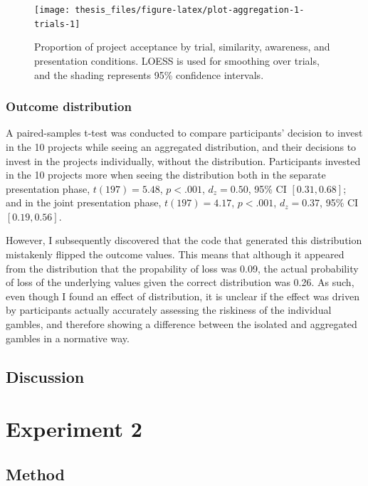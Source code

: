 \documentclass[a4paper, nobind, dvipsnames]{templates/ociamthesis}
\theoremstyle{definition}
\theoremstyle{definition}
\theoremstyle{definition}
\theoremstyle{definition}
\theoremstyle{remark}
\begin{document}
\begin{figure}
\texttt{[image: thesis\_files/figure-latex/plot-aggregation-1-trials-1]} \caption{Proportion of project acceptance by trial, similarity, awareness, and presentation conditions. LOESS is used for smoothing over trials, and the shading represents 95\% confidence intervals.}\label{fig:plot-aggregation-1-trials}
\end{figure}

\hypertarget{outcome-distribution-aggregation-1}{%
\subsubsection{Outcome distribution}\label{outcome-distribution-aggregation-1}}

A paired-samples t-test was conducted to compare participants' decision to
invest in the 10 projects while seeing an aggregated distribution, and their
decisions to invest in the projects individually, without the distribution.
Participants invested in the 10 projects more when seeing the distribution both
in the separate presentation phase,
\(t(197) = 5.48\), \(p < .001\), \(d_z = 0.50\), 95\% CI \([0.31, 0.68]\); and in the joint
presentation phase, \(t(197) = 4.17\), \(p < .001\), \(d_z = 0.37\), 95\% CI \([0.19, 0.56]\).

However, I subsequently discovered that the code that generated this
distribution mistakenly flipped the outcome values. This means that although it
appeared from the distribution that the propability of loss was
0.09, the actual probability of loss of the
underlying values given the correct distribution was
0.26. As such, even though I found an
effect of distribution, it is unclear if the effect was driven by participants
actually accurately assessing the riskiness of the individual gambles, and
therefore showing a difference between the isolated and aggregated gambles in a
normative way.

\hypertarget{discussion-aggregation-1-appendix}{%
\subsection{Discussion}\label{discussion-aggregation-1-appendix}}

\hypertarget{experiment-2-1}{%
\section{Experiment 2}\label{experiment-2-1}}

\hypertarget{method-7}{%
\subsection{Method}\label{method-7}}
\end{document}
